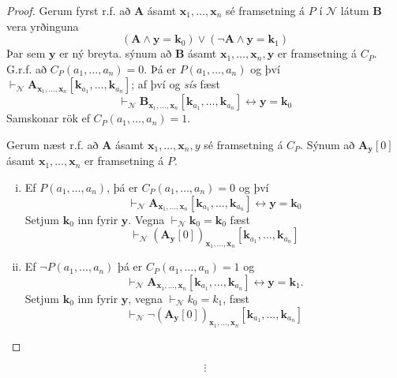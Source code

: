 \documentclass[12pt]{book}
\newcommand{\cN}{\mathcal{N}}
\newcommand{\bA}{\mathbf{A}}
\newcommand{\bB}{\mathbf{B}}
\newcommand{\bx}{\mathbf{x}}
\newcommand{\bk}{\mathbf{k}}
\newcommand{\by}{\mathbf{y}}
\newcommand{\bxxn}{\bx_1, \dotsc, \bx_n}
\newcommand{\aan}{a_1, \dotsc, a_n}
\begin{document}
\begin{proof}
  Gerum fyrst r.f. að $\bA$ ásamt $\bxxn$ sé framsetning á $P$ í $\cN$
  látum $\bB$ vera yrðinguna
  \[ ( \bA \wedge \by = \bk_0) \vee (\lnot \bA \wedge \by = \bk_1)\]
  Þar sem $\by$ er ný breyta. sýnum að $\bB$
  ásamt $\bxxn, \by$ er framsetning á $C_P$.
  G.r.f. að $C_P (\aan) = 0$. Þá er $P(\aan)$
  og því $\vdash_{\cN} \bA_{\bxxn} [\bk_{a_1}, \dotsc,\bk_{a_n}]$; af því og \emph{sís}
  fæst
  \[ \vdash_{\cN} \bB_{\bxxn} [ \bk_{a_1}, \dotsc,\bk_{a_n} ] \leftrightarrow \by = \bk_0 \]
  Samskonar rök ef $C_P (\aan) = 1$.

  Gerum næst r.f. að $\bA$ ásamt $\bxxn, y$ sé framsetning á $C_P$. Sýnum að
  $\bA_{\by}[0]$ ásamt $\bxxn$ er framsetning á $P$.
  \begin{enumerate}[(i)]
  \item Ef $P(\aan)$, þá er $C_P(\aan) = 0$ og því
    \[\vdash_{\cN} \bA_{\bxxn}[\bk_{a_1}, \dotsc,\bk_{a_n}] \leftrightarrow \by = \bk_0 \]
    Setjum $\bk_0$ inn fyrir $\by$. Vegna $\vdash_{\cN} \bk_0 = \bk_0$
    fæst \[\vdash_{\cN} ( \bA_{\by}[0] )_{\bxxn}[\bk_{a_1}, \dotsc,\bk_{a_n}]\]
  \item Ef $\lnot P(\aan)$ þá er $C_P ( \aan) = 1$
    og \[\vdash_{\cN} \bA_{\bxxn} [ \bk_{a_1}, \dotsc,\bk_{a_n}] \leftrightarrow \by = \bk_1.\]
    Setjum $\bk_0$ inn fyrir $\by$, vegna $\vdash_{\cN} k_0 = k_1$, fæst
    \[ \vdash_{\cN} \lnot (\bA_{\by}[0])_{\bxxn} [\bk_{a_1}, \dotsc,\bk_{a_n}]\]
  \end{enumerate}
\end{proof}












\[\vdots\]
\end{document}
